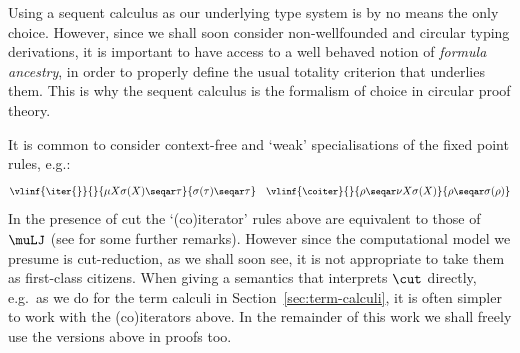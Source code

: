\begin{remark}
    Using a sequent calculus as our underlying type system is by no means the only choice. 
    However, since we shall soon consider non-wellfounded and circular typing derivations, it is important to have access to a well behaved notion of \emph{formula ancestry}, in order to properly define the usual totality criterion that underlies them.
    This is why the sequent calculus is the formalism of choice in circular proof theory.
\end{remark}


\begin{remark}
    \label{rem:iter-variations}
    It is common to consider context-free and `weak' specialisations of the fixed point rules, e.g.:
    \begin{equation}
    \small
        \label{eq:(co)iterators-as-rules}
            \vlinf{\iter{}}{}{\mu X \sigma(X)\seqar \tau}{\sigma(\tau)\seqar \tau}
    \quad
    \vlinf{\coiter}{}{\rho\seqar \nu X \sigma(X)}{\rho\seqar \sigma(\rho)}
    \end{equation}
    In the presence of cut the `(co)iterator' rules above are equivalent to those of $\muLJ$ (see  for some further remarks).
    However since the computational model we presume is cut-reduction, as we shall soon see, it is not appropriate to take them as first-class citizens.
    When giving a semantics that interprets $\cut$ directly, e.g.\ as we do for the term calculi in Section~\ref{sec:term-calculi}, it is often simpler to work with the (co)iterators above.
% 
    In the remainder of this work
    we shall freely use the versions above in proofs too.
\end{remark}





